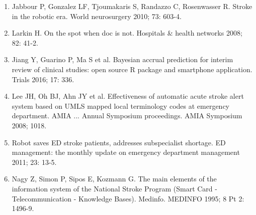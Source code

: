 {{\begin{enumerate}
    \item Jabbour P, Gonzalez LF, Tjoumakaris S, Randazzo C, Rosenwasser R. Stroke in the robotic era. World neurosurgery 2010; 73: 603-4.
    \item Larkin H. On the spot when doc is not. Hospitals \& health networks 2008; 82: 41-2.
    \item Jiang Y, Guarino P, Ma S et al. Bayesian accrual prediction for interim review of clinical studies: open source R package and smartphone application. Trials 2016; 17: 336.
    \item Lee JH, Oh BJ, Ahn JY et al. Effectiveness of automatic acute stroke alert system based on UMLS mapped local terminology codes at emergency department. AMIA ... Annual Symposium proceedings. AMIA Symposium 2008; 1018.
    \item Robot saves ED stroke patients, addresses subspecialist shortage. ED management: the monthly update on emergency department management 2011; 23: 13-5.
    \item Nagy Z, Simon P, Sipos E, Kozmann G. The main elements of the information system of the National Stroke Program (Smart Card - Telecommunication - Knowledge Bases). Medinfo. MEDINFO 1995; 8 Pt 2: 1496-9.
\end{enumerate}
}

}
